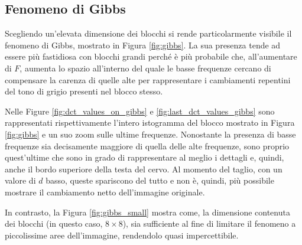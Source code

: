 \subsection{Fenomeno di Gibbs}

Scegliendo un'elevata dimensione dei blocchi si rende particolarmente visibile il fenomeno di Gibbs, mostrato in Figura \ref{fig:gibbs}. La sua presenza tende ad essere più fastidiosa con blocchi grandi perché è più probabile che, all'aumentare di $F$, aumenta lo spazio all'interno del quale le basse frequenze cercano di compensare la carenza di quelle alte per rappresentare i cambiamenti repentini del tono di grigio presenti nel blocco stesso.

Nelle Figure \ref{fig:dct_values_on_gibbs} e \ref{fig:last_dct_values_gibbs} sono rappresentati rispettivamente l'intero istogramma del blocco mostrato in Figura \ref{fig:gibbs} e un suo zoom sulle ultime frequenze. Nonostante la presenza di basse frequenze sia decisamente maggiore di quella delle alte frequenze, sono proprio quest'ultime che sono in grado di rappresentare al meglio i dettagli e, quindi, anche il bordo superiore della testa del cervo. Al momento del taglio, con un valore di $d$ basso, queste spariscono del tutto e non è, quindi, più possibile mostrare il cambiamento netto dell'immagine originale.

In contrasto, la Figura \ref{fig:gibbs_small} mostra come, la dimensione contenuta dei blocchi (in questo caso, $8 \times 8$), sia sufficiente al fine di limitare il fenomeno a piccolissime aree dell'immagine, rendendolo quasi impercettibile.

